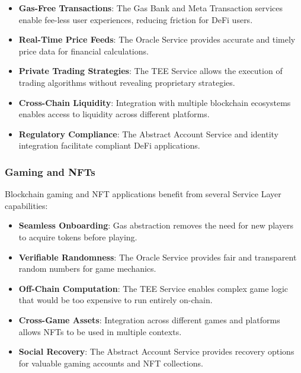 \begin{itemize}
    \item \textbf{Gas-Free Transactions}: The Gas Bank and Meta Transaction services enable fee-less user experiences, reducing friction for DeFi users.
    
    \item \textbf{Real-Time Price Feeds}: The Oracle Service provides accurate and timely price data for financial calculations.
    
    \item \textbf{Private Trading Strategies}: The TEE Service allows the execution of trading algorithms without revealing proprietary strategies.
    
    \item \textbf{Cross-Chain Liquidity}: Integration with multiple blockchain ecosystems enables access to liquidity across different platforms.
    
    \item \textbf{Regulatory Compliance}: The Abstract Account Service and identity integration facilitate compliant DeFi applications.
\end{itemize}

\subsubsection{Gaming and NFTs}
\label{subsubsec:gaming-nfts}

Blockchain gaming and NFT applications benefit from several Service Layer capabilities:

\begin{itemize}
    \item \textbf{Seamless Onboarding}: Gas abstraction removes the need for new players to acquire tokens before playing.
    
    \item \textbf{Verifiable Randomness}: The Oracle Service provides fair and transparent random numbers for game mechanics.
    
    \item \textbf{Off-Chain Computation}: The TEE Service enables complex game logic that would be too expensive to run entirely on-chain.
    
    \item \textbf{Cross-Game Assets}: Integration across different games and platforms allows NFTs to be used in multiple contexts.
    
    \item \textbf{Social Recovery}: The Abstract Account Service provides recovery options for valuable gaming accounts and NFT collections.
\end{itemize}

